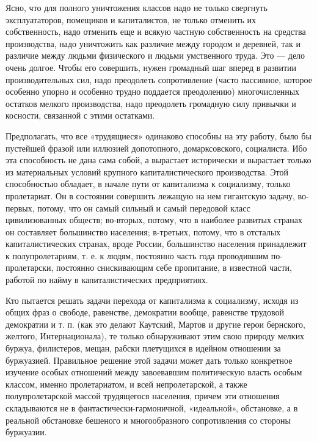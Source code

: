 \documentclass[12pt]{article}
\newcommand{\parnum}{(\arabic{parcount})}
\newcounter{parcount}
\newenvironment{parnumbers}{%
  \par%
  \everypar{\noindent \stepcounter{parcount}\marginpar[]{\parnum}}%
}{}
\begin{document}
\begin{parnumbers}
Ясно, что для полного уничтожения классов надо не только свергнуть эксплуататоров, помещиков и капиталистов, не только отменить их собственность, надо отменить еще и всякую частную собственность на средства производства, надо уничтожить как различие между городом и деревней, так и различие между людьми физического и людьми умственного труда. Это — дело очень долгое. Чтобы его совершить, нужен громадный шаг вперед в развитии производительных сил, надо преодолеть сопротивление (часто пассивное, которое особенно упорно и особенно трудно поддается преодолению) многочисленных остатков мелкого производства, надо преодолеть громадную силу привычки и косности, связанной с этими остатками.

Предполагать, что все «трудящиеся» одинаково способны на эту работу, было бы пустейшей фразой или иллюзией допотопного, домарксовского, социалиста. Ибо эта способность не дана сама собой, а вырастает исторически и вырастает только из материальных условий крупного капиталистического производства. Этой способностью обладает, в начале пути от капитализма к социализму, только пролетариат. Он в состоянии совершить лежащую на нем гигантскую задачу, во-первых, потому, что он самый сильный и самый передовой класс цивилизованных обществ; во-вторых, потому, что в наиболее развитых странах он составляет большинство населения; в-третьих, потому, что в отсталых капиталистических странах, вроде России, большинство населения принадлежит к полупролетариям, т. е. к людям, постоянно часть года проводившим по-пролетарски, постоянно снискивающим себе пропитание, в известной части, работой по найму в капиталистических предприятиях.

Кто пытается решать задачи перехода от капитализма к социализму, исходя из общих фраз о свободе, равенстве, демократии вообще, равенстве трудовой демократии и т. п. (как это делают Каутский, Мартов и другие герои бернского, желтого, Интернационала), те только обнаруживают этим свою природу мелких буржуа, филистеров, мещан, рабски плетущихся в идейном отношении за буржуазией. Правильное решение этой задачи может дать только конкретное изучение особых отношений между завоевавшим политическую власть особым классом, именно пролетариатом, и всей непролетарской, а также полупролетарской массой трудящегося населения, причем эти отношения складываются не в фантастически-гармоничной, «идеальной», обстановке, а в реальной обстановке бешеного и многообразного сопротивления со стороны буржуазии.


\end{parnumbers}
\end{document}
